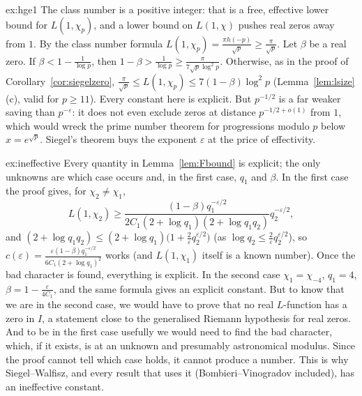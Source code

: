 \begin{solution}{ex:hge1}
\idea The class number is a positive integer: that is a free, effective lower bound for $L(1,\chi_p)$, and a lower bound on $L(1,\chi)$ pushes real zeros away from $1$.
\writeup By the class number formula $L(1,\chi_p)=\frac{\pi h(-p)}{\sqrt p}\ge\frac\pi{\sqrt p}$. Let $\beta$ be a real zero. If $\beta<1-\frac1{\log p}$, then $1-\beta>\frac1{\log p}\ge\frac\pi{7\sqrt p\log^2p}$. Otherwise, as in the proof of Corollary~\ref{cor:siegelzero}, $\frac\pi{\sqrt p}\le L(1,\chi_p)\le7(1-\beta)\log^2p$ (Lemma~\ref{lem:lsize}(c), valid for $p\ge11$).
Every constant here is explicit. But $p^{-1/2}$ is a far weaker saving than $p^{-\varepsilon}$: it does not even exclude zeros at distance $p^{-1/2+o(1)}$ from $1$, which would wreck the prime number theorem for progressions modulo $p$ below $x=e^{\sqrt p}$. Siegel's theorem buys the exponent $\varepsilon$ at the price of effectivity.
\end{solution}

\begin{solution}{ex:ineffective}
\idea Every quantity in Lemma~\ref{lem:Fbound} is explicit; the only unknowns are which case occurs and, in the first case, $q_1$ and $\beta$.
\writeup In the first case the proof gives, for $\chi_2\ne\chi_1$,
\[
L(1,\chi_2)\ge\frac{(1-\beta)q_1^{-\varepsilon/2}}{2C_1(2+\log q_1)(2+\log q_1q_2)}q_2^{-\varepsilon/2},
\]
and $(2+\log q_1q_2)\le(2+\log q_1)\bigl(1+\frac2\varepsilon q_2^{\varepsilon/2}\bigr)$ (as $\log q_2\le\frac2\varepsilon q_2^{\varepsilon/2}$), so $c(\varepsilon)=\frac{\varepsilon(1-\beta)q_1^{-\varepsilon/2}}{6C_1(2+\log q_1)^2}$ works (and $L(1,\chi_1)$ itself is a known number). Once the bad character is found, everything is explicit. In the second case $\chi_1=\chi_{-4}$, $q_1=4$, $\beta=1-\frac\varepsilon{4C_1}$, and
the same formula gives an explicit constant. But to know that we are in the second case, we would have to prove that no real $L$-function has a zero in $I$, a statement close to the generalised Riemann hypothesis for real zeros. And to be in the first case usefully we would need to find the bad character, which, if it exists, is at an unknown and presumably astronomical modulus. Since the
proof cannot tell which case holds, it cannot produce a number. This is why Siegel--Walfisz, and every result that uses it (Bombieri--Vinogradov included), has an ineffective constant.
\end{solution}

